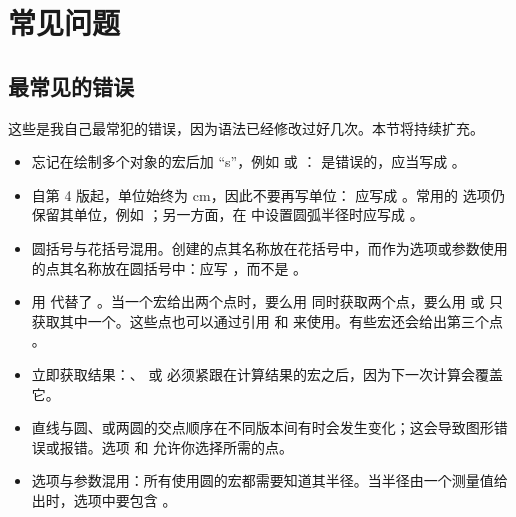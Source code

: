 \section{常见问题}

\subsection{最常见的错误}
这些是我自己最常犯的错误，因为语法已经修改过好几次。本节将持续扩充。

\begin{itemize}\setlength{\itemsep}{10pt}
  \item 忘记在绘制多个对象的宏后加 ``s''，例如  或 ： 是错误的，应当写成 。

  \item 自第 4 版起，单位始终为 cm，因此不要再写单位： 应写成 。常用的  选项仍保留其单位，例如 ；另一方面，在  中设置圆弧半径时应写成 。

  \item 圆括号与花括号混用。创建的点其名称放在花括号中，而作为选项或参数使用的点其名称放在圆括号中：应写 ，而不是 。

  \item 用  代替了 。当一个宏给出两个点时，要么用  同时获取两个点，要么用  或  只获取其中一个。这些点也可以通过引用  和  来使用。有些宏还会给出第三个点 。

  \item 立即获取结果：、 或  必须紧跟在计算结果的宏之后，因为下一次计算会覆盖它。

  \item 直线与圆、或两圆的交点顺序在不同版本间有时会发生变化；这会导致图形错误或报错。选项  和  允许你选择所需的点。

  \item 选项与参数混用：所有使用圆的宏都需要知道其半径。当半径由一个测量值给出时，选项中要包含 。


\end{itemize}
